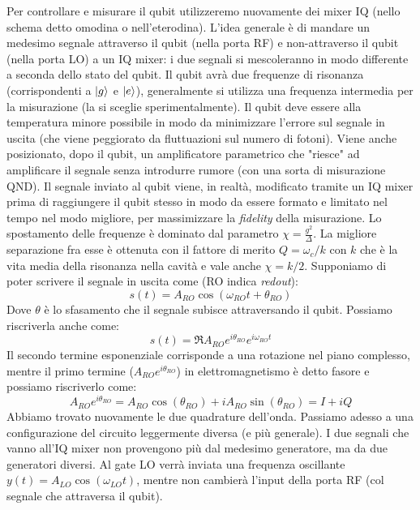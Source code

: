 Per controllare e misurare il qubit utilizzeremo nuovamente dei mixer IQ (nello schema detto omodina o nell'eterodina).
L'idea generale è di mandare un medesimo segnale attraverso il qubit (nella porta RF) e non-attraverso il qubit (nella porta LO) a un IQ mixer: i due segnali si mescoleranno in modo differente a seconda dello stato del qubit.
Il qubit avrà due frequenze di risonanza (corrispondenti a $\ket g$ e $\ket e$), generalmente si utilizza una frequenza intermedia per la misurazione (la si sceglie sperimentalmente). Il qubit deve essere alla temperatura minore possibile in modo da minimizzare l'errore sul segnale in uscita (che viene peggiorato da fluttuazioni sul numero di fotoni). Viene anche posizionato, dopo il qubit, un amplificatore parametrico che "riesce" ad amplificare il segnale senza introdurre rumore (con una sorta di misurazione QND).
Il segnale inviato al qubit viene, in realtà, modificato tramite un IQ mixer prima di raggiungere il qubit stesso in modo da essere formato e limitato nel tempo nel modo migliore, per massimizzare la \textit{fidelity} della misurazione.
Lo spostamento delle frequenze è dominato dal parametro $\chi = \frac{g^2}{\Delta}$. La migliore separazione fra esse è ottenuta con il fattore di merito $Q=\omega_c / k$ con $k$ che è la vita media della risonanza nella cavità e vale anche $\chi = k/2$.
Supponiamo di poter scrivere il segnale in uscita come (RO indica \textit{redout}):
\begin{equation*}
    s(t)=A_{RO}\cos(\omega_{RO}t+\theta_{RO})
\end{equation*}
Dove $\theta$ è lo sfasamento che il segnale subisce attraversando il qubit.
Possiamo riscriverla anche come:
\begin{equation*}
    s(t)=\Re{A_{RO}e^{i\theta_{RO}}e^{i\omega_{RO}t}}
\end{equation*}
Il secondo termine esponenziale corrisponde a una rotazione nel piano complesso, mentre il primo termine ($A_{RO}e^{i\theta_{RO}}$) in elettromagnetismo è detto fasore e possiamo riscriverlo come:
\begin{equation*}
    A_{RO}e^{i\theta_{RO}}=A_{RO}\cos(\theta_{RO})+iA_{RO}\sin(\theta_{RO})=I+iQ
\end{equation*}
Abbiamo trovato nuovamente le due quadrature dell'onda.
Passiamo adesso a una configurazione del circuito leggermente diversa (e più generale). I due segnali che vanno all'IQ mixer non provengono più dal medesimo generatore, ma da due generatori diversi. Al gate LO verrà inviata una frequenza oscillante $y(t)=A_{LO}\cos(\omega_{LO}t)$, mentre non cambierà l'input della porta RF (col segnale che attraversa il qubit). 
